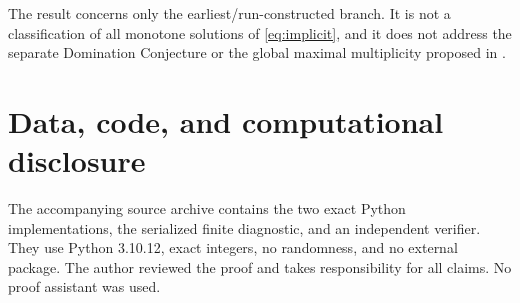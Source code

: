 \documentclass[11pt]{amsart}
\theoremstyle{definition}
\begin{document}
The result concerns only the earliest/run-constructed branch.  It is not a
classification of all monotone solutions of \eqref{eq:implicit}, and it does
not address the separate Domination Conjecture or the global maximal
multiplicity proposed in \cite{Cloitre2026Almost}.

\section*{Data, code, and computational disclosure}

The accompanying source archive contains the two exact Python
implementations, the serialized finite diagnostic, and an independent
verifier.  They use Python 3.10.12, exact integers, no randomness, and no
external package.  The author reviewed the proof and takes responsibility
for all claims.  No proof assistant was used.

\begingroup
\raggedright


\endgroup
\end{document}
